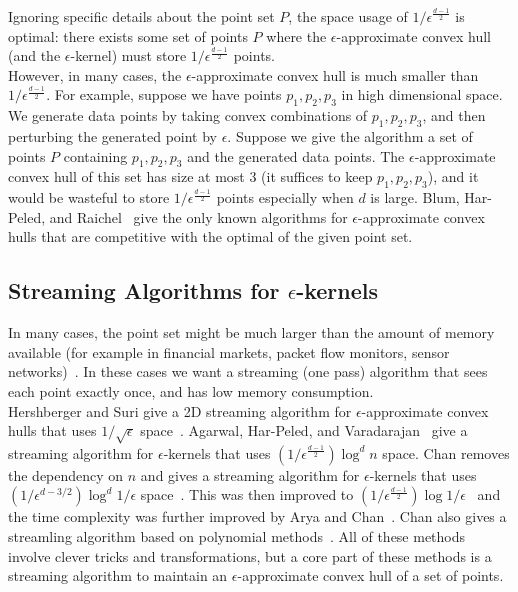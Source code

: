 Ignoring specific details about the point set $P$, the space usage of $1/\epsilon^{\frac{d-1}{2}}$ is optimal: there exists some set of points $P$ where the $\epsilon$-approximate convex hull (and the $\epsilon$-kernel) must store $1/\epsilon^{\frac{d-1}{2}}$ points.
\\

However, in many cases, the $\epsilon$-approximate convex hull is much smaller than $1/\epsilon^{\frac{d-1}{2}}$. For example, suppose we have points $p_1, p_2, p_3$ in high dimensional space. We generate data points by taking convex combinations of $p_1, p_2, p_3$, and then perturbing the generated point by $\epsilon$. Suppose we give the algorithm a set of points $P$ containing $p_1, p_2, p_3$ and the generated data points. The $\epsilon$-approximate convex hull of this set has size at most 3 (it suffices to keep $p_1, p_2, p_3$), and it would be wasteful to store $1/\epsilon^{\frac{d-1}{2}}$ points especially when $d$ is large. Blum, Har-Peled, and Raichel~\cite{blum-peled} give the only known algorithms for $\epsilon$-approximate convex hulls that are competitive with the optimal of the given point set.

\subsection{Streaming Algorithms for $\epsilon$-kernels}

In many cases, the point set might be much larger than the amount of memory available (for example in financial markets, packet flow monitors, sensor networks)~\cite{Hershberger:2004:ASG:1055558.1055595}. In these cases we want a streaming (one pass) algorithm that sees each point exactly once, and has low memory consumption.
\\

Hershberger and Suri give a 2D streaming algorithm for $\epsilon$-approximate convex hulls that uses $1/\sqrt{\epsilon}$ space~\cite{Hershberger:2004:ASG:1055558.1055595}. Agarwal, Har-Peled, and Varadarajan~\cite{Agarwal:2004:AEM:1008731.1008736} give a streaming algorithm for $\epsilon$-kernels that uses $(1/\epsilon^{\frac{d-1}{2}})\log^d{n}$ space. Chan removes the dependency on $n$ and gives a streaming algorithm for $\epsilon$-kernels that uses $(1/\epsilon^{d-3/2})\log^d{1/\epsilon}$ space~\cite{CHAN200620}. This was then improved to $(1/\epsilon^{\frac{d-1}{2}})\log{1/\epsilon}$~\cite{Zarrabi-Zadeh:2011:ASS:1967334.1967341} and the time complexity was further improved by Arya and Chan~\cite{Arya:2014:BOA:2582112.2582161}. Chan also gives a streamling algorithm based on polynomial methods~\cite{chansocg2016}. All of these methods involve clever tricks and transformations, but a core part of these methods is a streaming algorithm to maintain an $\epsilon$-approximate convex hull of a set of points.
\\


